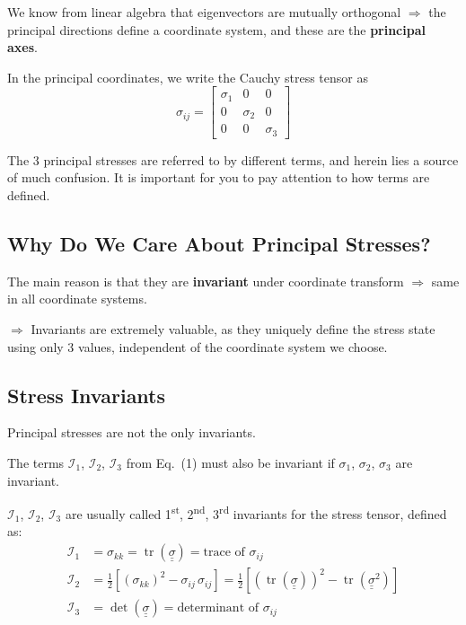 \documentclass[11pt]{article}
\newcommand{\tens}[1]{\underline{\underline{#1}}}
\begin{document}
We know from linear algebra that eigenvectors are mutually orthogonal $\Rightarrow$ the principal directions define a coordinate system, and these are the \textbf{principal axes}.

In the principal coordinates, we write the Cauchy stress tensor as
\begin{equation}
  \sigma_{ij} =
  \begin{bmatrix}
    \sigma_1 & 0 & 0 \\
    0 & \sigma_2 & 0 \\
    0 & 0 & \sigma_3
  \end{bmatrix}
\end{equation}

The 3 principal stresses are referred to by different terms, and herein lies a source of much confusion. It is important for you to pay attention to how terms are defined. 


\subsection{Why Do We Care About Principal Stresses?}

The main reason is that they are \textbf{invariant} under coordinate transform $\Rightarrow$ same in all coordinate systems.

$\Rightarrow$ Invariants are extremely valuable, as they uniquely define the stress state using only 3 values, independent of the coordinate system we choose.

\subsection{Stress Invariants}

Principal stresses are not the only invariants.

The terms $\mathcal{I}_1$, $\mathcal{I}_2$, $\mathcal{I}_3$ from Eq.~(1) must also be invariant if $\sigma_1$, $\sigma_2$, $\sigma_3$ are invariant.

$\mathcal{I}_1$, $\mathcal{I}_2$, $\mathcal{I}_3$ are usually called 1\textsuperscript{st}, 2\textsuperscript{nd}, 3\textsuperscript{rd} invariants for the stress tensor, defined as:
\begin{align}
  \mathcal{I}_1 &= \sigma_{kk} = \operatorname{tr}(\tens{\sigma})
                  = \text{trace of } \sigma_{ij} \\
  \mathcal{I}_2 &= \tfrac{1}{2}\!\left[(\sigma_{kk})^2 - \sigma_{ij}\,\sigma_{ij}\right]
                  = \tfrac{1}{2}\!\left[\left(\operatorname{tr}(\tens{\sigma})\right)^2
                    - \operatorname{tr}(\tens{\sigma}^2)\right] \\
  \mathcal{I}_3 &= \det(\tens{\sigma}) = \text{determinant of } \sigma_{ij}
\end{align}
\end{document}
